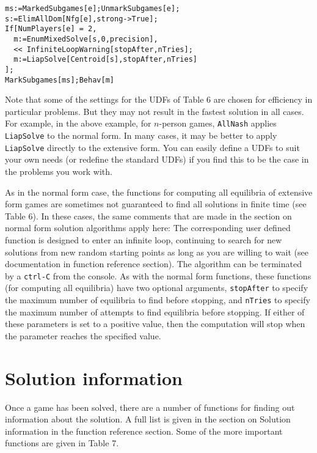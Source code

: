 \begin{verbatim}
ms:=MarkedSubgames[e];UnmarkSubgames[e];
s:=ElimAllDom[Nfg[e],strong->True];
If[NumPlayers[e] = 2, 
  m:=EnumMixedSolve[s,0,precision],
  << InfiniteLoopWarning[stopAfter,nTries];
  m:=LiapSolve[Centroid[s],stopAfter,nTries]
];
MarkSubgames[ms];Behav[m]
\end{verbatim} 

Note that some of the settings for the UDFs of Table 6 are chosen for
efficiency in particular problems.  But they may not result in the
fastest solution in all cases.  For example, in the above example, for
$n$-person games, \verb+AllNash+ applies \verb+LiapSolve+ to the normal form.
In many cases, it may be better to apply \verb+LiapSolve+ directly to
the extensive form.  You can easily define a UDFs to suit your own
needs (or redefine the standard UDFs) if you find this to be the case
in the problems you work with.  

As in the normal form case, the functions for computing all equilibria
of extensive form games are sometimes not guaranteed to find all
solutions in finite time (see Table 6).  In these cases, the same
comments that are made in the section on normal form solution
algorithms apply here: The corresponding user defined function is
designed to enter an infinite loop, continuing to search for new
solutions from new random starting points as long as you are willing
to wait (see documentation in function reference section).  The
algorithm can be terminated by a \verb+ctrl-C+ from the console.  As
with the normal form functions, these functions (for computing all
equilibria) have two optional arguments, \verb+stopAfter+ to specify
the maximum number of equilibria to find before stopping, and
\verb+nTries+ to specify the maximum number of attempts to find
equilibria before stopping. If either of these parameters is set to a
positive value, then the computation will stop when the parameter
reaches the specified value.

\section{Solution information}

Once a game has been solved, there are a number of functions for
finding out information about the solution.  A full list is given in
the section on Solution information in the function reference section.
Some of the more important functions are given in Table 7. 

